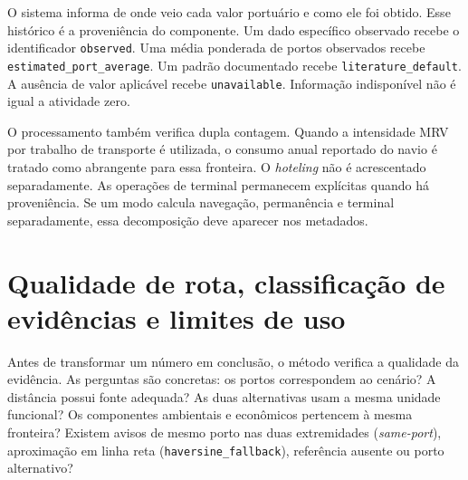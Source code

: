 O sistema informa de onde veio cada valor portuário e como ele foi obtido. Esse histórico é a proveniência do componente. Um dado específico observado recebe o identificador \texttt{observed}. Uma média ponderada de portos observados recebe \texttt{estimated\_port\_average}. Um padrão documentado recebe \texttt{literature\_default}. A ausência de valor aplicável recebe \texttt{unavailable}. Informação indisponível não é igual a atividade zero.

O processamento também verifica dupla contagem. Quando a intensidade MRV por trabalho de transporte é utilizada, o consumo anual reportado do navio é tratado como abrangente para essa fronteira. O \emph{hoteling} não é acrescentado separadamente. As operações de terminal permanecem explícitas quando há proveniência. Se um modo calcula navegação, permanência e terminal separadamente, essa decomposição deve aparecer nos metadados.

\section{Qualidade de rota, classificação de evidências e limites de uso}
\label{sec:qualidade-evidencias}

Antes de transformar um número em conclusão, o método verifica a qualidade da evidência. As perguntas são concretas: os portos correspondem ao cenário? A distância possui fonte adequada? As duas alternativas usam a mesma unidade funcional? Os componentes ambientais e econômicos pertencem à mesma fronteira? Existem avisos de mesmo porto nas duas extremidades (\emph{same-port}), aproximação em linha reta (\texttt{haversine\_fallback}), referência ausente ou porto alternativo?

